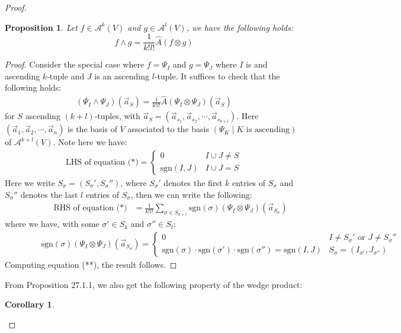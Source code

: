 \documentclass[11pt,oneside]{book}
\theoremstyle{break}
\theoremstyle{break}
\newtheorem{prop}[lem]{Proposition}
\newtheorem{corT}[lem]{Corollary}
\newcommand{\A}{\mathcal{A}}
\begin{document}
\begin{proof}
\begin{prop}\setlength{\leftskip}{1cm}
Let $f \in \A^k(V)$ and $g \in \A^l(V)$, we have the following holds:
$$f\wedge g = \frac{1}{k!l!}\hat{A}(f\otimes g)$$
\end{prop} 
\begin{proof}\setlength{\leftskip}{1cm}
Consider the special case where $f = \Psi_I$ and $g = \Psi_J$ where $I$ is and ascending $k$-tuple and $J$ is an ascending $l$-tuple. It suffices to check that the following holds:
\begin{align*}
(\Psi_I \wedge \Psi_J)(\vec{a}_S) = \frac{1}{k!l!}\hat{A}(\Psi_I \otimes \Psi_J)(\vec{a}_S) \tag{*}
\end{align*}
for $S$ ascending $(k+l)$-tuples, with $\vec{a}_S = (\vec{a}_{s_1},\vec{a}_{s_2}, \cdots, \vec{a}_{s_{k+l}})$. Here $(\vec{a}_1,\vec{a}_2,\cdots,\vec{a}_n)$ is the basis of $V$ associated to the basis $(\Psi_K \mid K \text{ is ascending})$ of $\A^{k+l}(V)$. Note here we have:
\begin{align*}
\text{LHS of equation (*)} = \begin{cases}0 & I \cup J \neq S \\ \text{sgn}(I,J)& I \cup J = S \end{cases}
\end{align*}
Here we write $S_{\sigma} = (S_{\sigma}', S_{\sigma}'')$, where $S_{\sigma}'$ denotes the first $k$ entries of $S_{\sigma}$ and $S_{\sigma}''$ denotes the last $l$ entries of $S_{\sigma}$, then we can write the following:
\begin{align*}
\qquad\qquad\text{RHS of equation (*)} &= \frac{1}{k!l!}\sum_{\sigma \in S_{k+l}}\text{sgn}(\sigma) (\Psi_I \otimes \Psi_J ) (\vec{a}_{S_{\sigma}}) \tag{**}
\end{align*}
where we have, with some $\sigma' \in S_k$ and $\sigma'' \in S_l$:
\begin{align*}
\qquad\qquad\text{sgn}(\sigma) (\Psi_I \otimes \Psi_J ) (\vec{a}_{S_{\sigma}}) = \begin{cases} 0 & I\neq S_\sigma' \text{ or } J \neq S_\sigma'' \\ \text{sgn}(\sigma)\cdot \text{sgn}(\sigma')\cdot \text{sgn}(\sigma'')=\text{sgn}(I,J) & S_{\sigma} = (I_{\sigma'}, J_{\sigma''})\end{cases}
\end{align*}
Computing equation (**), the result follows.
\end{proof}
From Proposition 27.1.1, we also get the following property of the wedge product:
\begin{corT}\setlength{\leftskip}{1cm}

\end{corT}
\end{proof}
\end{document}
